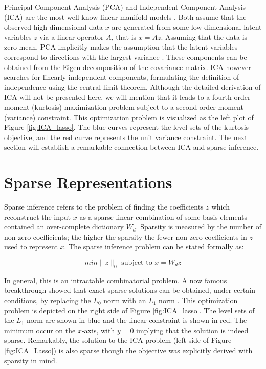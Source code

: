 Principal Component Analysis (PCA) and Independent Component Analysis (ICA) are
the most well know linear manifold models \cite{ICA}. Both assume that the
observed high dimensional data $x$ are generated from some low dimensional
latent variables $z$ via a linear operator $A$, that is $x=Az$. Assuming that
the data is zero mean, PCA implicitly makes the assumption that the latent
variables correspond to directions with the largest variance \cite{PCA}.  These
components can be obtained from the Eigen decomposition of the covariance
matrix.  ICA however searches for linearly independent components, formulating
the definition of independence using the central limit theorem. Although the
detailed derivation of ICA will not be presented here, we will mention that it
leads to a fourth order moment (kurtosis) maximization problem subject to a
second order moment (variance) constraint. This optimization problem is
visualized as the left plot of Figure \ref{fig:ICA_lasso}. The blue curves
represent the level sets of the kurtosis objective, and the red curve
represents the unit variance constraint. The next section will establish a 
remarkable connection between ICA and sparse inference.  

\section{Sparse Representations} 
Sparse inference refers to the problem of finding the coefficients $z$ which
reconstruct the input $x$ as a sparse linear combination of some basis elements
contained an over-complete dictionary $W_d$. Sparsity is measured by the number
of non-zero coefficients; the higher the sparsity the fewer non-zero
coefficients in $z$ used to represent $x$.  
The sparse inference problem can be stated formally as: 

\begin{equation} 
min \|z\|_0 \mbox{ subject to } x = W_dz 
\end{equation} 

In general, this is an intractable combinatorial problem. A now famous
breakthrough showed that exact sparse solutions can be obtained, under certain
conditions, by replacing the $L_0$ norm with an $L_1$ norm \cite{candes2006}.
This optimization problem is depicted on the right side of Figure
\ref{fig:ICA_lasso}.  The level sets of the $L_1$ norm are shown in blue and
the linear constraint is shown in red. The minimum occur on the $x$-axis, with
$y=0$ implying that the solution is indeed sparse. Remarkably, the solution to
the ICA problem (left side of Figure \ref{fig:ICA_Lasso}) is also sparse though the
objective was explicitly derived with sparsity in mind.    

